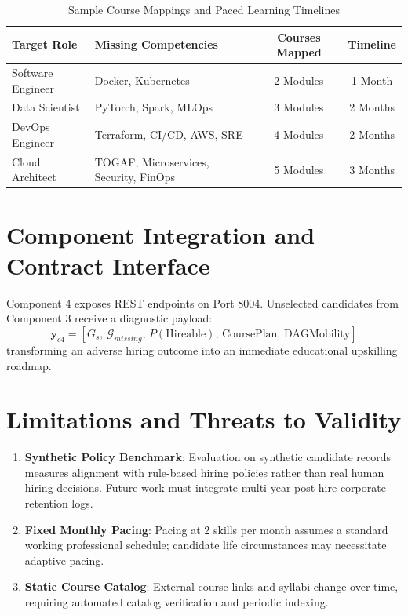 \documentclass[conference]{IEEEtran}
\begin{document}
\begin{table}[h]
\centering
\caption{Sample Course Mappings and Paced Learning Timelines}
\label{tab:c4_courses}
\begin{tabular}{@{}llcc@{}}
\toprule
\textbf{Target Role} & \textbf{Missing Competencies} & \textbf{Courses Mapped} & \textbf{Timeline} \\
\midrule
Software Engineer & Docker, Kubernetes & 2 Modules & 1 Month \\
Data Scientist & PyTorch, Spark, MLOps & 3 Modules & 2 Months \\
DevOps Engineer & Terraform, CI/CD, AWS, SRE & 4 Modules & 2 Months \\
Cloud Architect & TOGAF, Microservices, Security, FinOps & 5 Modules & 3 Months \\
\bottomrule
\end{tabular}
\end{table}

\section{Component Integration and Contract Interface}
Component 4 exposes REST endpoints on Port 8004. Unselected candidates from Component 3 receive a diagnostic payload:
\begin{equation}
\mathbf{y}_{c4} = \left[ G_s, \, \mathcal{G}_{missing}, \, P(\text{Hireable}), \, \text{CoursePlan}, \, \text{DAGMobility} \right]
\end{equation}
transforming an adverse hiring outcome into an immediate educational upskilling roadmap.

\section{Limitations and Threats to Validity}
\begin{enumerate}
    \item \textbf{Synthetic Policy Benchmark}: Evaluation on synthetic candidate records measures alignment with rule-based hiring policies rather than real human hiring decisions. Future work must integrate multi-year post-hire corporate retention logs.
    \item \textbf{Fixed Monthly Pacing}: Pacing at 2 skills per month assumes a standard working professional schedule; candidate life circumstances may necessitate adaptive pacing.
    \item \textbf{Static Course Catalog}: External course links and syllabi change over time, requiring automated catalog verification and periodic indexing.
\end{enumerate}
\end{document}
